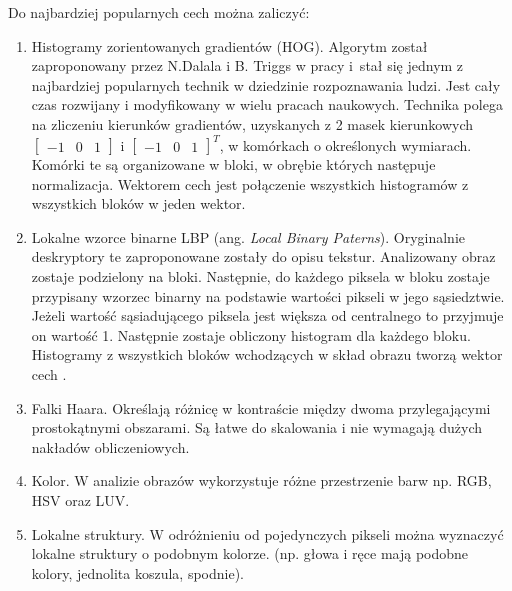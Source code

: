 Do najbardziej popularnych cech można zaliczyć:

\begin{enumerate}
\item Histogramy zorientowanych gradientów (HOG). %
Algorytm został zaproponowany przez N.Dalala i B. Triggs w pracy \cite{dalal2005histograms} i~stał się jednym z najbardziej popularnych technik w dziedzinie rozpoznawania ludzi. %
Jest cały czas rozwijany i modyfikowany w wielu pracach naukowych.
Technika polega na zliczeniu kierunków gradientów, uzyskanych z 2 masek kierunkowych \(\begin{bmatrix}-1 & 0 & 1\end{bmatrix} \) i \( \begin{bmatrix}-1 & 0 & 1 \end{bmatrix}^T\), w komórkach o określonych wymiarach. 
Komórki te są organizowane w bloki, w obrębie których następuje normalizacja. 
Wektorem cech jest połączenie wszystkich histogramów z wszystkich bloków w jeden wektor.


\item Lokalne wzorce binarne LBP (ang. \textit{Local Binary Paterns}).
Oryginalnie deskryptory te zaproponowane zostały do opisu tekstur. %
Analizowany obraz zostaje podzielony na bloki. 
Następnie, do każdego piksela w bloku zostaje przypisany wzorzec binarny na podstawie wartości pikseli w jego sąsiedztwie. 
Jeżeli wartość sąsiadującego piksela jest większa od centralnego to przyjmuje on wartość 1. 
Następnie zostaje obliczony histogram dla każdego bloku. 
Histogramy z wszystkich bloków wchodzących w skład obrazu tworzą wektor cech \cite{ojala2002multiresolution}.

\item Falki Haara.
Określają różnicę w kontraście między dwoma przylegającymi prostokątnymi obszarami. 
Są łatwe do skalowania i nie wymagają dużych nakładów obliczeniowych.


\item Kolor. W analizie obrazów wykorzystuje różne przestrzenie barw np. RGB, HSV oraz LUV.

\item Lokalne struktury. W odróżnieniu od pojedynczych pikseli można wyznaczyć lokalne struktury o podobnym kolorze. (np. głowa i ręce mają podobne kolory, jednolita koszula, spodnie).


\end{enumerate}


